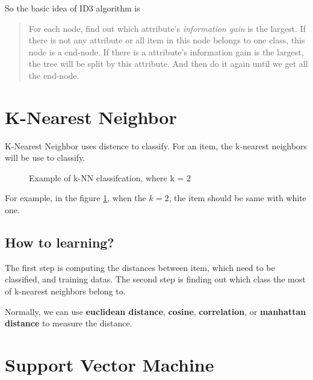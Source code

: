 \documentclass{article}
\begin{document}
So the basic idea of ID3 algorithm is 
\begin{quote}
  For each node, find out which attribute's \textit{information gain} is the largest.
  If there is not any attribute or all item in this node belongs to one class, this node is a end-node.
  If there is a attribute's information gain is the largest, the tree will be split by this attribute.
  And then do it again until we get all the end-node.
\end{quote}

\section{K-Nearest Neighbor}
\label{sec:knn}

K-Nearest Neighbor uses distence to classify. For an item, the k-nearest neighbors will be use
to classify.
\begin{figure}
  \centering
  \caption{Example of k-NN classifcation, where k = 2}
  \label{fig:knn:eg}
\end{figure}
For example, in the figure \ref{fig:knn:eg}, when the $k=2$, the item should be same with white one.

\subsection{How to learning?}
\label{sec:knn:learning}

The first step is computing the distances between item, which need to be classified, and training datas.
The second step is finding out which class the most of k-nearest neighbors belong to.

Normally, we can use \textbf{euclidean distance}, \textbf{cosine}, \textbf{correlation},
or \textbf{manhattan distance} to measure the distance.

\section{Support Vector Machine}
\label{sec:svm}
\end{document}
